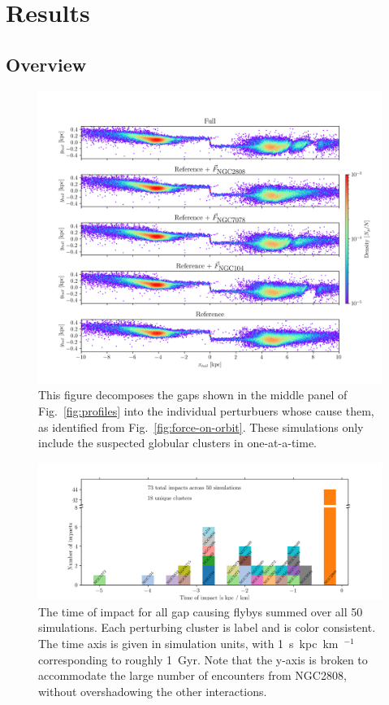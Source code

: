 \documentclass[draft]{aa}
\begin{document}
\section{Results}



  \subsection{Overview}

    \begin{figure}
      \centering
      \includegraphics[width=\linewidth]{decomposition-monte-carlo-009-with-3-gaps.png}
      \caption{This figure decomposes the gaps shown in the middle panel of Fig.~\ref{fig:profiles} into the individual perturbuers whose cause them, as identified from Fig.~\ref{fig:force-on-orbit}. These simulations only include the suspected globular clusters in one-at-a-time.}
      \label{fig:decomposition}
      \end{figure} 
    
    \begin{figure}
      \centering
      \includegraphics[width=\linewidth]{histogram_impact_time.png}
      \caption{The time of impact for all gap causing flybys summed over all 50 simulations. Each perturbing cluster is label and is color consistent. The time axis is given in simulation units, with 1~s~kpc~km~$^{-1}$ corresponding to roughly 1~Gyr. Note that the y-axis is broken to accommodate the large number of encounters from NGC2808, without overshadowing the other interactions.}
      \label{fig:histogram_impact_time}
      \end{figure}
\end{document}
